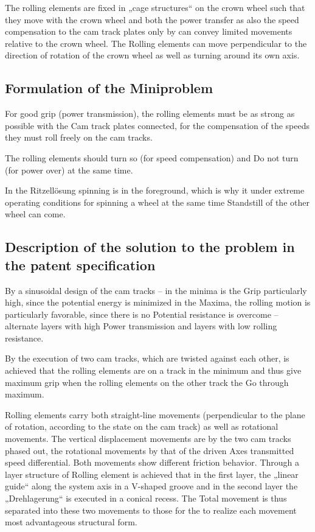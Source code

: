 \documentclass[11pt,a4paper]{article}
\begin{document}
The rolling elements are fixed in „cage structures“ on the crown wheel such
that they move with the crown wheel and both the power transfer as also the
speed compensation to the cam track plates only by can convey limited
movements relative to the crown wheel. The Rolling elements can move
perpendicular to the direction of rotation of the crown wheel as well as
turning around its own axis.
  
\subsection{Formulation of the Miniproblem}

For good grip (power transmission), the rolling elements must be as strong as
possible with the Cam track plates connected, for the compensation of the
speeds they must roll freely on the cam tracks.

The rolling elements should turn so (for speed compensation) and Do not turn
(for power over) at the same time.

In the Ritzellösung spinning is in the foreground, which is why it under
extreme operating conditions for spinning a wheel at the same time Standstill
of the other wheel can come.

\subsection{Description of the solution to the problem in the patent
  specification} 

By a sinusoidal design of the cam tracks -- in the minima is the Grip
particularly high, since the potential energy is minimized in the Maxima, the
rolling motion is particularly favorable, since there is no Potential
resistance is overcome -- alternate layers with high Power transmission and
layers with low rolling resistance.

By the execution of two cam tracks, which are twisted against each other, is
achieved that the rolling elements are on a track in the minimum and thus give
maximum grip when the rolling elements on the other track the Go through
maximum.

Rolling elements carry both straight-line movements (perpendicular to the
plane of rotation, according to the state on the cam track) as well as
rotational movements. The vertical displacement movements are by the two cam
tracks phased out, the rotational movements by that of the driven Axes
transmitted speed differential. Both movements show different friction
behavior. Through a layer structure of Rolling element is achieved that in the
first layer, the „linear guide“ along the system axis in a V-shaped groove and
in the second layer the „Drehlagerung“ is executed in a conical recess. The
Total movement is thus separated into these two movements to those for the to
realize each movement most advantageous structural form.
\end{document}
